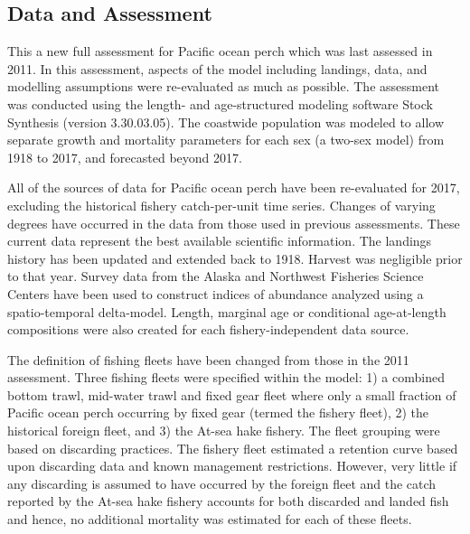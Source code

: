 \documentclass[12pt,]{article}
\begin{document}
\FloatBarrier

\subsection*{Data and Assessment}\label{data-and-assessment}

This a new full assessment for Pacific ocean perch which was last
assessed in 2011. In this assessment, aspects of the model including
landings, data, and modelling assumptions were re-evaluated as much as
possible. The assessment was conducted using the length- and
age-structured modeling software Stock Synthesis (version 3.30.03.05).
The coastwide population was modeled to allow separate growth and
mortality parameters for each sex (a two-sex model) from 1918 to 2017,
and forecasted beyond 2017.

All of the sources of data for Pacific ocean perch have been
re-evaluated for 2017, excluding the historical fishery catch-per-unit
time series. Changes of varying degrees have occurred in the data from
those used in previous assessments. These current data represent the
best available scientific information. The landings history has been
updated and extended back to 1918. Harvest was negligible prior to that
year. Survey data from the Alaska and Northwest Fisheries Science
Centers have been used to construct indices of abundance analyzed using
a spatio-temporal delta-model. Length, marginal age or conditional
age-at-length compositions were also created for each
fishery-independent data source.

The definition of fishing fleets have been changed from those in the
2011 assessment. Three fishing fleets were specified within the model:
1) a combined bottom trawl, mid-water trawl and fixed gear fleet where
only a small fraction of Pacific ocean perch occurring by fixed gear
(termed the fishery fleet), 2) the historical foreign fleet, and 3) the
At-sea hake fishery. The fleet grouping were based on discarding
practices. The fishery fleet estimated a retention curve based upon
discarding data and known management restrictions. However, very little
if any discarding is assumed to have occurred by the foreign fleet and
the catch reported by the At-sea hake fishery accounts for both
discarded and landed fish and hence, no additional mortality was
estimated for each of these fleets.
\end{document}

